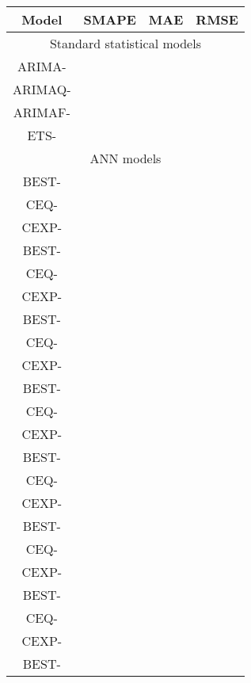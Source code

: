 \documentclass[energies,article,accept,moreauthors,pdftex,12pt,a4paper]{mdpi}
\newcommand{\ann}{ANN\xspace}
\begin{document}
\begin{table} [H]
\scriptsize \centering

 \begin{tabular}{cccccccccc}
 \toprule
 \bf {Model} & \multicolumn{3}{c}{\bf {SMAPE}} & \multicolumn{3}{c}{\bf {MAE}} & \multicolumn{3}{c}{\bf {RMSE}}\\
 \midrule
 \multicolumn{10}{c}{Standard statistical models}\\
 \hline
 ARIMA-   &  &  &  &  &  &  &  &  & \\
 ARIMAQ-   &  &  &  &  &  &  &  &  & \\
 ARIMAF-   &  &  &  &  &  &  &  &  & \\
 ETS-   &  &  &  &  &  &  &  &  & \\
\hline
 \multicolumn{10}{c}{\ann models}\\
 \hline
 BEST-   &  &  &  &  &  &  &  &  & \\
 CEQ-   &  &  &  &  &  &  &  &  & \\
 CEXP-   &  &  &  &  &  &  &  &  & \\
 \hline
 BEST-   &  &  &  &  &  &  &  &  & \\
 CEQ-   &  &  &  &  &  &  &  &  & \\
 CEXP-   &  &  &  &  &  &  &  &  & \\
 \hline
 BEST-   &  &  &  &  &  &  &  &  & \\
 CEQ-   &  &  &  &  &  &  &  &  & \\
 CEXP-   &  &  &  &  &  &  &  &  & \\
 \hline
 BEST-  &  &  &  &  &  &  &  &  & \\
 CEQ-   &  &  &  &  &  &  &  &  & \\
 \rowcolor{lightgray}
 CEXP-  &  &  &  &  &  &  &  &  & \\
 \hline
 BEST-  &  &  &  &  &  &  &  &  & \\
 CEQ-   &  &  &  &  &  &  &  &  & \\
 CEXP-  &  &  &  &  &  &  &  &  & \\
 \hline
 BEST-  &  &  &  &  &  &  &  &  & \\
 CEQ-   &  &  &  &  &  &  &  &  & \\
 CEXP-  &  &  &  &  &  &  &  &  & \\
 \hline
 BEST-  &  &  &  &  &  &  &  &  & \\
 CEQ-   &  &  &  &  &  &  &  &  & \\
 CEXP-  &  &  &  &  &  &  &  &  & \\
 \hline
 BEST-  &  &  &  &  &  &  &  &  & \\

\end{tabular}
\end{table}
\end{document}
